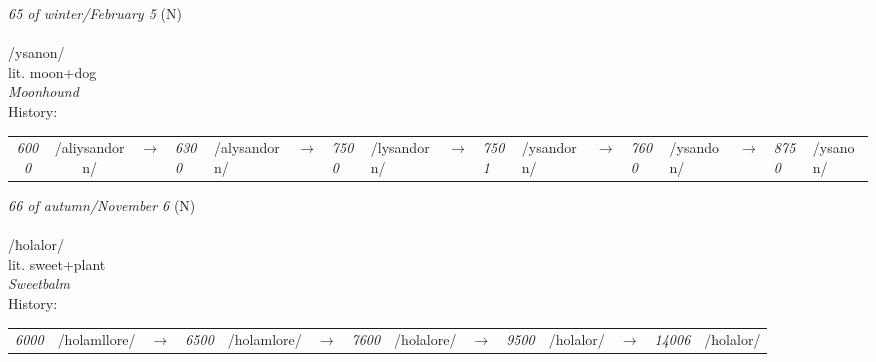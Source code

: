 \vspace{15pt}
\begin{nopagebreak}
 \textit{65 of winter/February 5} (N)\\
\\
\noindent /ys{\textprimstress}anon/\\
\noindent lit. moon+dog\\
\noindent \textit{Moonhound}\\


\noindent History:

\vspace{-0pt}
\hspace{40pt}
\begin{tabular}{ccc}
\textit{6000} & /aliysandorn/&$\rightarrow$ & \textit{6300} & /alysandorn/&$\rightarrow$ & \textit{7500} & /lysandorn/&$\rightarrow$ & \textit{7501} & /ysandorn/&$\rightarrow$ & \textit{7600} & /ysandon/&$\rightarrow$ & \textit{8750} & /ysanon/& \\
\end{tabular}

\vspace{20pt}\hline

\end{nopagebreak}
\filbreak



\vspace{15pt}
\begin{nopagebreak}
 \textit{66 of autumn/November 6} (N)\\
\\
\noindent /ħol{\textprimstress}alor/\\
\noindent lit. sweet+plant\\
\noindent \textit{Sweetbalm}\\


\noindent History:

\vspace{-0pt}
\hspace{40pt}
\begin{tabular}{ccc}
\textit{6000} & /holamllore/&$\rightarrow$ & \textit{6500} & /holamlore/&$\rightarrow$ & \textit{7600} & /holalore/&$\rightarrow$ & \textit{9500} & /holalor/&$\rightarrow$ & \textit{14006} & /ħolalor/& \\
\end{tabular}

\vspace{20pt}\hline

\end{nopagebreak}
\filbreak



